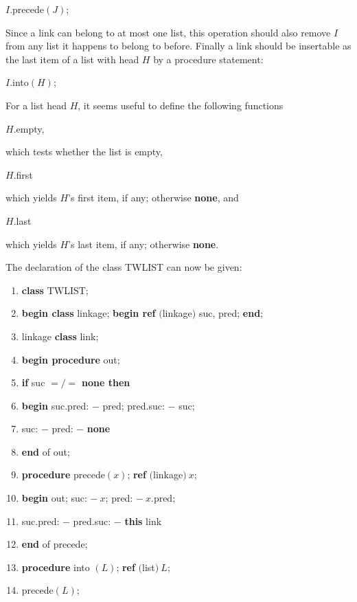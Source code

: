 \quad $I$.precede$(J)$;

\noindent
Since a link can belong to at most one list, this operation should also remove $I$ from any list it happens to belong to before. Finally a link should be insertable as the last item of a list with head $H$ by a procedure statement:

\quad $I$.into$(H)$;

For a list head $H$, it seems useful to define the following functions

\quad $H$.empty,

\noindent
which tests whether the list is empty,

\quad $H$.first

\noindent
which yields $H$'s first item, if any; otherwise \textbf{none}, and

\quad $H$.last

\noindent
which yields $H$'s last item, if any; otherwise \textbf{none}.

The declaration of the class TWLIST can now be given:

\begin{enumerate}[nosep, label=\arabic*.]
	\item \textbf{class} TWLIST;
	\item \textbf{begin class} linkage; \textbf{begin ref} $($linkage$)$ suc, pred; \textbf{end};
	\item \quad linkage \textbf{class} link;
	\item \quad \textbf{begin procedure} out;
	\item \quad \quad \textbf{if} suc $=/=$ \textbf{none then}
	\item \quad \quad \textbf{begin} suc.pred: $-$ pred; pred.suc: $-$ suc;
	\item \quad \quad \quad suc: $-$ pred: $-$ \textbf{none}
	\item \quad \quad \textbf{end} of out;
	\item \quad \quad \textbf{procedure} precede$(x)$; \textbf{ref} $($linkage$)\ x$;
	\item \quad \quad \textbf{begin} out; suc: $-\ x$; pred: $-\ x$.pred;
	\item \quad \quad \quad suc.pred: $-$ pred.suc: $-$ \textbf{this} link
	\item \quad \quad \textbf{end} of precede;
	\item \quad \quad \textbf{procedure} into $(L)$; \textbf{ref} $($list$)\ L$;
	\item \quad \quad \quad precede$(L)$;
\end{enumerate}

